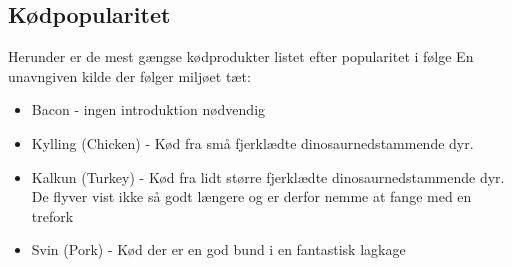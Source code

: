 \subsection{Kødpopularitet}

Herunder er de mest gængse kødprodukter listet efter popularitet i følge En unavngiven kilde der følger miljøet tæt:\\
\begin{itemize}
\item Bacon \cite{bib:url:WikiBacon} - ingen introduktion nødvendig
\item Kylling (Chicken) \cite{bib:url:WikiChicken} - Kød fra små fjerklædte dinosaurnedstammende dyr.
\item Kalkun (Turkey) \cite{bib:url:WikiTurkey}- Kød fra lidt større fjerklædte dinosaurnedstammende dyr. De flyver vist ikke så godt længere og er derfor nemme at fange med en trefork
\item Svin (Pork) \cite{bib:url:WikiPork} - Kød der er en god bund i en fantastisk lagkage
\end{itemize}

\begin{center}
\end{center}

